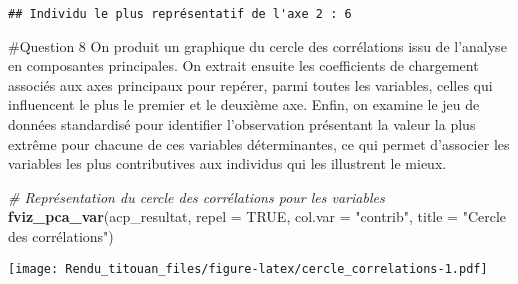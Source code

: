\documentclass[
]{article}
\newenvironment{Shaded}{\begin{snugshade}}{\end{snugshade}}
\newcommand{\AttributeTok}[1]{\textcolor[rgb]{0.13,0.29,0.53}{#1}}
\newcommand{\CommentTok}[1]{\textcolor[rgb]{0.56,0.35,0.01}{\textit{#1}}}
\newcommand{\ConstantTok}[1]{\textcolor[rgb]{0.56,0.35,0.01}{#1}}
\newcommand{\DecValTok}[1]{\textcolor[rgb]{0.00,0.00,0.81}{#1}}
\newcommand{\FunctionTok}[1]{\textcolor[rgb]{0.13,0.29,0.53}{\textbf{#1}}}
\newcommand{\NormalTok}[1]{#1}
\newcommand{\OtherTok}[1]{\textcolor[rgb]{0.56,0.35,0.01}{#1}}
\newcommand{\SpecialCharTok}[1]{\textcolor[rgb]{0.81,0.36,0.00}{\textbf{#1}}}
\newcommand{\StringTok}[1]{\textcolor[rgb]{0.31,0.60,0.02}{#1}}
\begin{document}
\begin{verbatim}
## Individu le plus représentatif de l'axe 2 : 6
\end{verbatim}

\#Question 8 On produit un graphique du cercle des corrélations issu de
l'analyse en composantes principales. On extrait ensuite les
coefficients de chargement associés aux axes principaux pour repérer,
parmi toutes les variables, celles qui influencent le plus le premier et
le deuxième axe. Enfin, on examine le jeu de données standardisé pour
identifier l'observation présentant la valeur la plus extrême pour
chacune de ces variables déterminantes, ce qui permet d'associer les
variables les plus contributives aux individus qui les illustrent le
mieux.

\begin{Shaded}
\begin{Highlighting}[]
\CommentTok{\# Représentation du cercle des corrélations pour les variables}
\FunctionTok{fviz\_pca\_var}\NormalTok{(acp\_resultat, }\AttributeTok{repel =} \ConstantTok{TRUE}\NormalTok{, }\AttributeTok{col.var =} \StringTok{"contrib"}\NormalTok{,}
             \AttributeTok{title =} \StringTok{"Cercle des corrélations"}\NormalTok{)}
\end{Highlighting}
\end{Shaded}

\texttt{[image: Rendu\_titouan\_files/figure-latex/cercle\_correlations-1.pdf]}

\begin{Shaded}
\end{Shaded}
\end{document}
